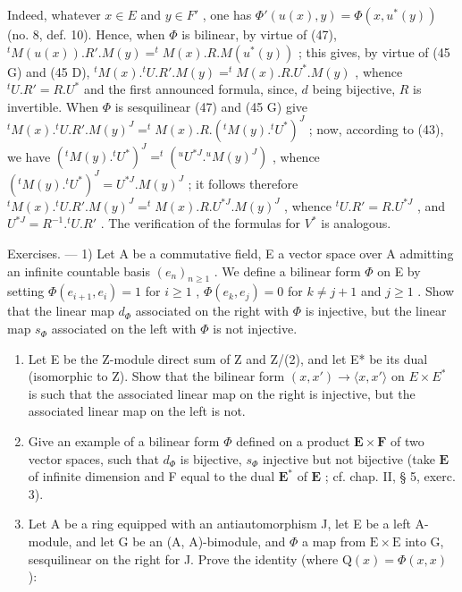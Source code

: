 Indeed, whatever \(x \in E\) and \(y \in F'\) , one has \(\Phi'(u(x), y) = \Phi(x, u^*(y))\) (no. 8, def. 10). Hence, when \(\Phi\) is bilinear, by virtue of (47), \(^t M(u(x)). R'. M(y) = ^t M(x). R. M(u^*(y))\) ; this gives, by virtue of (45 G) and (45 D), \(^t M(x). ^t U. R'. M(y) = ^t M(x). R. U^*. M(y)\) , whence \(^t U. R' = R. U^*\) and the first announced formula, since, \(d\) being bijective, \(R\) is invertible. When \(\Phi\) is sesquilinear (47) and (45 G) give \(^t M(x). ^t U. R'. M(y)^J = ^t M(x). R. (^{t}M(y). ^{t}U^*)^{J}\) ; now, according to (43), we have \((^{t}M(y). ^{t}U^*)^{J} = ^{t}(^{u}U^{*J}. ^{u}M(y)^{J})\) , whence \((^{t}M(y). ^{t}U^*)^{J} = U^{*J}. M(y)^{J}\) ; it follows therefore \(^t M(x). ^{t}U. R'. M(y)^{J} = ^{t}M(x). R. U^{*J}. M(y)^{J}\) , whence \(^t U. R' = R. U^{*J}\) , and \(U^{*J} = R^{-1}. ^{t}U. R'\) . The verification of the formulas for \(V^*\) is analogous.

Exercises. --- 1) Let A be a commutative field, E a vector space over A admitting an infinite countable basis \((e_n)_{n \geqslant 1}\) . We define a bilinear form \(\Phi\) on E by setting \(\Phi(e_{i+1}, e_i) = 1\) for \(i \geqslant 1\) , \(\Phi(e_k, e_j) = 0\) for \(k \neq j + 1\) and \(j \geqslant 1\) . Show that the linear map \(d_\Phi\) associated on the right with \(\Phi\) is injective, but the linear map \(s_\Phi\) associated on the left with \(\Phi\) is not injective.

\begin{enumerate}
\def\labelenumi{\arabic{enumi})}
\setcounter{enumi}{1}
\item
  Let E be the Z-module direct sum of Z and Z/(2), and let E* be its dual (isomorphic to Z). Show that the bilinear form \((x, x') \to \langle x, x' \rangle\) on \(E \times E^*\) is such that the associated linear map on the right is injective, but the associated linear map on the left is not.
\item
  Give an example of a bilinear form \(\Phi\) defined on a product \(\mathbf{E} \times \mathbf{F}\) of two vector spaces, such that \(d_{\Phi}\) is bijective, \(s_{\Phi}\) injective but not bijective (take \(\mathbf{E}\) of infinite dimension and F equal to the dual \(\mathbf{E}^*\) of \(\mathbf{E}\) ; cf. chap. II, § 5, exerc. 3).
\item
  Let A be a ring equipped with an antiautomorphism J, let E be a left A-module, and let G be an (A, A)-bimodule, and \(\Phi\) a map from \(\mathrm{E} \times \mathrm{E}\) into G, sesquilinear on the right for J. Prove the identity (where \(\mathrm{Q}(x) = \Phi(x, x)\) ):
\end{enumerate}

